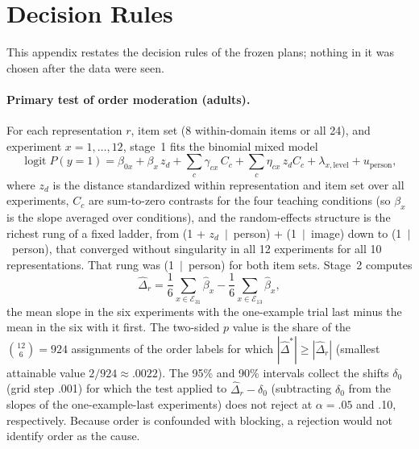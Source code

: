 \clearpage
\section{Decision Rules}
\label{app:rules}

This appendix restates the decision rules of the frozen plans; nothing in it was chosen after the data were seen.

\paragraph{Primary test of order moderation (adults).} For each representation $r$, item set (8 within-domain items or all 24), and experiment $x = 1, \dots, 12$, stage~1 fits the binomial mixed model
\[
\operatorname{logit} P(y = 1) = \beta_{0x} + \beta_x\, z_d + \textstyle\sum_c \gamma_{cx}\, C_c + \sum_c \eta_{cx}\, z_d C_c + \lambda_{x,\text{level}} + u_{\text{person}},
\]
where $z_d$ is the distance standardized within representation and item set over all experiments, $C_c$ are sum-to-zero contrasts for the four teaching conditions (so $\beta_x$ is the slope averaged over conditions), and the random-effects structure is the richest rung of a fixed ladder, from (1 + $z_d$~$\mid$~person) + (1~$\mid$~image) down to (1~$\mid$~person), that converged without singularity in all 12 experiments for all 10 representations. That rung was (1~$\mid$~person) for both item sets. Stage~2 computes
\[
\hat\Delta_r = \frac{1}{6}\sum_{x \in \mathcal{E}_{31}} \hat\beta_x - \frac{1}{6}\sum_{x \in \mathcal{E}_{13}} \hat\beta_x ,
\]
the mean slope in the six experiments with the one-example trial last minus the mean in the six with it first. The two-sided $p$ value is the share of the $\binom{12}{6} = 924$ assignments of the order labels for which $|\hat\Delta^{*}| \geq |\hat\Delta_r|$ (smallest attainable value $2/924 \approx .0022$). The 95\% and 90\% intervals collect the shifts $\delta_0$ (grid step .001) for which the test applied to $\hat\Delta_r - \delta_0$ (subtracting $\delta_0$ from the slopes of the one-example-last experiments) does not reject at $\alpha = .05$ and .10, respectively. Because order is confounded with blocking, a rejection would not identify order as the cause.

